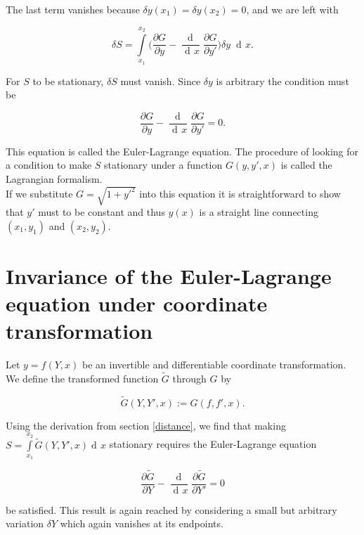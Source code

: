 \documentclass{article}
\DeclareMathOperator{\dd}{d\!}
\begin{document}
The last term vanishes because $\delta y(x_1) = \delta y(x_2) = 0$, and we are left with


\begin{equation}
\delta S = \int\limits_{x_1}^{x_2} \bigg( \frac{\partial G}{\partial y}
- \frac{\dd}{\dd x}\frac{\partial G}{\partial y'} \bigg) \delta y \; \dd x.
\end{equation}

For $S$ to be stationary, $\delta S$ must vanish. Since $\delta y$ is arbitrary the condition must be


\begin{equation}\label{e-l}
\frac{\partial G}{\partial y} - \frac{\dd}{\dd x}\frac{\partial G}{\partial y'} = 0.
\end{equation}

This equation is called the Euler-Lagrange equation. The procedure of looking for a condition to make $S$ stationary under a function $G(y,y',x)$ is called the Lagrangian formalism.\\

If we substitute $G = \sqrt{1+y'^2}$ into this equation it is straightforward to show that $y'$ must to be constant and thus $y(x)$ is a straight line connecting $(x_1,y_1)$ and $(x_2,y_2)$.

\section{Invariance of the Euler-Lagrange equation under coordinate transformation \cite{Kleinert}}

Let $y=f(Y,x)$ be an invertible and differentiable coordinate transformation. We define the transformed function $\widetilde{G}$ through $G$ by

\begin{equation}
\widetilde{G}(Y,Y',x) := G(f,f',x).
\end{equation}

Using the derivation from section \ref{distance}, we find that making $S = \int\limits_{x_1}^{x_2} \widetilde{G}(Y,Y',x) \dd x$ stationary requires the Euler-Lagrange equation

\begin{equation}
\frac{\partial \widetilde{G}}{\partial Y}
- \frac{\dd}{\dd x}\frac{\partial \widetilde{G}}{\partial Y'} = 0
\end{equation}

be satisfied. This result is again reached by considering a small but arbitrary variation $\delta Y$ which again vanishes at its endpoints.\\
\end{document}
